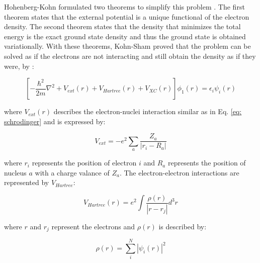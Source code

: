Hohenberg-Kohn formulated two theorems to simplify this problem \cite{Hohenberg1964}. The first theorem states that the external potential is a unique functional of the electron density. The second theorem states that the density that minimizes the total energy is the exact ground state density and thus the ground state is obtained variationally. With these theorems, Kohn-Sham proved that the problem can be solved as if the electrons are not interacting and still obtain the density as if they were, by \cite{Kohn1965}:
 
 \begin{equation}
 \label{eq: kohnsham}
\left[ -\frac{\hbar^2}{2m} \nabla^{2} + V_{ext} (r) + V_{Hartree}(r) + V_{XC} (r) \right] \phi_{1}(r) = \epsilon_{i} \psi_{i}(r)
 \end{equation}
 
 \noindent where $V_{ext}(r)$ describes the electron-nuclei interaction similar as in Eq. \ref{eq: schrodinger} and is expressed by:

\begin{equation}
\label{eq: vext}
V_{ext} = - e^2 \sum_{a} \frac {Z_{a}}{|r_i - R_a|}
\end{equation}

\noindent where $r_i$ represents the position of electron $i$ and $R_a$ represents the position of nucleus $a$ with a charge valance of $Z_a$. The electron-electron interactions are represented by $V_{Hartree}$:

\begin{equation}
\label{eq: vhartree}
V_{Hartree} (r) = e^{2} \int \frac {\rho(r)}{|r - r_{j}|} d^3r
\end{equation}

\noindent where $r$ and $r_j$ represent the electrons and $\rho (r)$ is described by:

\begin{equation}
\label{eq: rhop}
\rho (r) = \sum_{i}^N | \psi_{i} (r) |^2
\end{equation}

